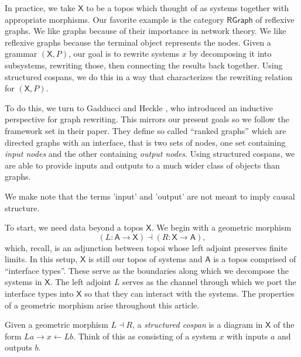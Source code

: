 \documentclass{amsart}
\newcommand{\A}{\cat{A}}
\newcommand{\X}{\cat{X}}
\newcommand{\RGraph}{\cat{RGraph}}
\newcommand{\cat}[1]{\mathsf{#1}}
\newcommand{\from}{\colon}
\renewcommand{\gets}{\leftarrow}
\theoremstyle{remark}
\theoremstyle{definition}
\begin{document}
In practice, we take $ \X $ to be a topos which thought of as systems together with appropriate morphisms.  Our favorite example is the category $ \RGraph $
of reflexive graphs. We like graphs because of their
importance in network theory. We like reflexive graphs because the terminal object represents the nodes.  Given a
grammar $ ( \X , P ) $, our goal is to rewrite systems $ x $
by decomposing it into subsystems, rewriting those, then
connecting the results back together.  Using structured
cospans, we do this in a way that characterizes the
rewriting relation for $ ( \X , P ) $.

To do this, we turn to Gadducci and Heckle
\cite{Gadd_IndGraphTrans}, who introduced an inductive
perspective for graph rewriting. This mirrors our present goals so we follow the framework set in their
paper.  They define so called ``ranked graphs'' which are
directed graphs with an interface, that is two sets of
nodes, one set containing \emph{input nodes} and the other
containing \emph{output nodes}. Using structured cospans,
we are able to provide inputs and outputs to a much wider
class of objects than graphs.

We make note that the terms 'input' and 'output' are not
meant to imply causal structure.

To start, we need data beyond a topos $ \X $.
We begin with a geometric morphism
%
\[
  ( L \from \A \to \X ) \dashv ( R \from \X \to \A ),
\]
% 
which, recall, is an adjunction between topoi whose left
adjoint preserves finite limits.  In this setup, $ \X $ is
still our topos of systems and $ \A $ is a topos comprised
of ``interface types''.  These serve as the boundaries along
which we decompose the systems in $ \X $.  The left adjoint
$ L $ serves as the channel through which we port the
interface types into $ \X $ so that they can interact with
the systems.  The properties of a geometric morphism arise
throughout this article.

Given a geometric morphism $ L \dashv R $, a
\emph{structured cospan} is a diagram in $ \X $ of the form
$ La \to x \gets Lb $. Think of this as consisting of a system $ x $ with inputs $ a $ and outputs $ b $.
\end{document}
